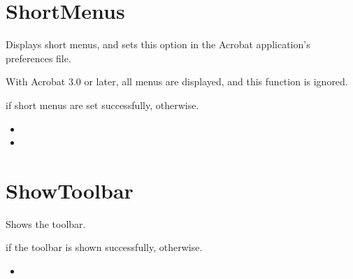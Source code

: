 \documentclass[letterpaper,12pt,english,openany,oneside]{sphinxmanual}
\begin{document}
\section{ShortMenus}
\label{\detokenize{IAC_API_DDE_Messages:shortmenus}}
Displays short menus, and sets this option in the Acrobat application’s preferences file.

With Acrobat 3.0 or later, all menus are displayed, and this function is ignored.


\begin{sphinxVerbatim}[commandchars=\\\{\}]
\PYG{p}{[}\PYG{p}{]}
\end{sphinxVerbatim}


 if short menus are set successfully,  otherwise.

\label{\detokenize{IAC_API_DDE_Messages:related-methods-28}}
\begin{itemize}
\item {} 

\item {} 

\end{itemize}




\section{ShowToolbar}
\label{\detokenize{IAC_API_DDE_Messages:id46}}
Shows the toolbar.


\begin{sphinxVerbatim}[commandchars=\\\{\}]
\PYG{p}{[}\PYG{p}{]}
\end{sphinxVerbatim}


 if the toolbar is shown successfully,  otherwise.

\label{\detokenize{IAC_API_DDE_Messages:related-methods-29}}
\begin{itemize}
\item {} 

\end{itemize}
\end{document}
